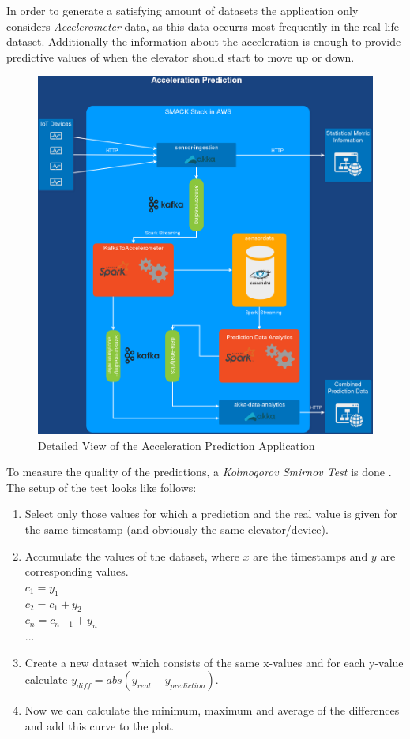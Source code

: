 In order to generate a satisfying amount of datasets the application only considers \textit{Accelerometer} data, as this data occurrs most frequently in the real-life dataset.
Additionally the information about the acceleration is enough to provide predictive values of when the elevator should start to move up or down.

\begin{figure}[!htbp]
  \centering
  \includegraphics[keepaspectratio=true,scale=0.33]{img/prediction}
    \caption{Detailed View of the Acceleration Prediction Application}
  \label{fig:prediction}
\end{figure}


To measure the quality of the predictions, a \textit{Kolmogorov Smirnov Test} is done \cite{wilcox2005kolmogorov}.
The setup of the test looks like follows:\\
\begin{enumerate}
    \item Select only those values for which a prediction and the real value is given for the same timestamp (and obviously the same elevator/device).
    \item Accumulate the values of the dataset, where $x$ are the timestamps and $y$ are corresponding values.\\
          $c_1 = y_1$\\
          $c_2 = c_1 + y_2$\\
          $c_n = c_{n-1} + y_n$\\
          ...
    \item Create a new dataset which consists of the same x-values and for each y-value calculate $y_{diff} = abs(y_{real} - y_{prediction})$.
    \item Now we can calculate the minimum, maximum and average of the differences and add this curve to the plot.
\end{enumerate}

